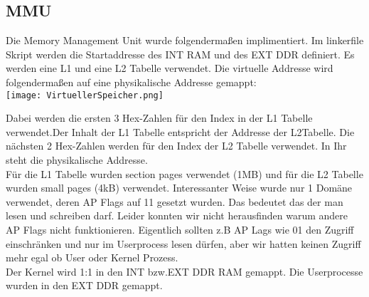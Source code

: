 \subsection{MMU}
Die Memory Management Unit wurde folgendermaßen implimentiert. 
Im linkerfile Skript werden die Startaddresse des INT RAM und des EXT DDR definiert. Es werden eine L1 und eine L2 Tabelle verwendet. Die virtuelle Addresse wird folgendermaßen auf eine physikalische Addresse gemappt:\\
\texttt{[image: VirtuellerSpeicher.png]} 

Dabei werden die ersten 3 Hex-Zahlen für den Index in der L1 Tabelle verwendet.Der Inhalt der L1 Tabelle entspricht der Addresse der L2Tabelle. Die nächsten 2 Hex-Zahlen werden für den Index der L2 Tabelle verwendet. In Ihr steht die physikalische Addresse.\\
Für die L1 Tabelle wurden section pages verwendet (1MB) und für die L2 Tabelle wurden small pages (4kB) verwendet.
Interessanter Weise wurde nur 1 Domäne verwendet, deren AP Flags auf 11 gesetzt wurden. Das bedeutet das der man lesen und schreiben darf. Leider konnten wir nicht herausfinden warum andere AP Flags nicht funktionieren. Eigentlich sollten z.B AP Lags wie 01 den Zugriff einschränken und nur im Userprocess lesen dürfen, aber wir hatten keinen Zugriff mehr egal ob User oder Kernel Prozess.\\

Der Kernel wird 1:1 in den INT bzw.EXT DDR RAM gemappt. Die Userprocesse wurden in den EXT DDR gemappt.
\newpage
